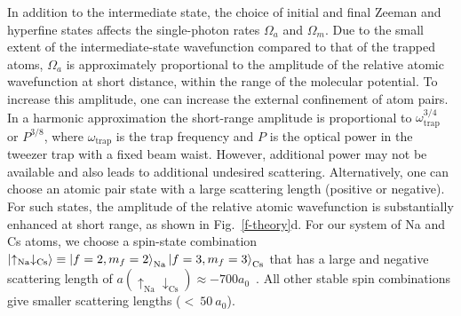\documentclass[aps,prl,twocolumn,10pt,superscriptaddress]{revtex4-1}
\newcommand{\Na}{\mathrm{Na}}
\newcommand{\Cs}{\mathrm{Cs}}
\begin{document}
In addition to the intermediate state,
the choice of initial and final Zeeman and hyperfine states affects the single-photon rates $\Omega_a$ and $\Omega_m$.
Due to the small extent of the intermediate-state wavefunction
compared to that of the trapped atoms,
$\Omega_a$ is approximately proportional to
the amplitude of the relative atomic wavefunction at short distance,
within the range of the molecular potential.
To increase this amplitude, one can increase the external confinement of atom pairs.
In a harmonic approximation
the short-range amplitude is proportional to $ \omega_{\text{trap}}^{3/4} $ or $P^{3/8}$,
where $ \omega_{\text{trap}} $ is the trap frequency and $P$ is the optical power in the tweezer trap \cite{Mies2000} with a fixed beam waist. However, additional power may not be available and also leads to additional undesired scattering.
Alternatively, one can choose an atomic pair state with a large scattering length
(positive or negative).
For such states, the amplitude of the relative atomic wavefunction is substantially enhanced
at short range, as shown in Fig.~\ref{f-theory}d.
For our system of Na and Cs atoms,
we choose a spin-state combination $\ket{\uparrow_{\Na} \downarrow_{\Cs}}\equiv \ket{f=2,m_f=2}_{\Na}\ket{f=3,m_f=3}_{\Cs}$ that has a large and negative scattering length of
$a(\uparrow_{\Na} \downarrow_{\Cs}) \approx -700a_0$~\cite{Hood2019}.
All other stable spin combinations give smaller scattering lengths ($<~50~a_0$).
\end{document}
